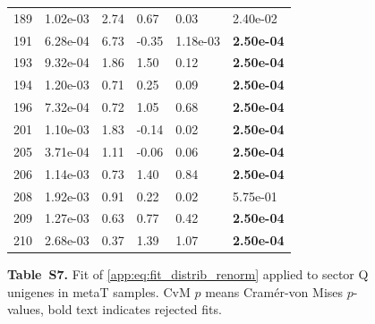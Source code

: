 \begin{figure}[htbp!]
{\begin{minipage}[t]{0.48\linewidth}
\begin{tabular}{llllll}
                    189 & 1.02e-03 & 2.74 & 0.67 & 0.03 & 2.40e-02\\
                    191 & 6.28e-04 & 6.73 & -0.35 & 1.18e-03 & \textbf{2.50e-04}\\
                    193 & 9.32e-04 & 1.86 & 1.50 & 0.12 & \textbf{2.50e-04}\\
                    194 & 1.20e-03 & 0.71 & 0.25 & 0.09 & \textbf{2.50e-04}\\
                    196 & 7.32e-04 & 0.72 & 1.05 & 0.68 & \textbf{2.50e-04}\\
                    201 & 1.10e-03 & 1.83 & -0.14 & 0.02 & \textbf{2.50e-04}\\
                    205 & 3.71e-04 & 1.11 & -0.06 & 0.06 & \textbf{2.50e-04}\\
                    206 & 1.14e-03 & 0.73 & 1.40 & 0.84 & \textbf{2.50e-04}\\
                    208 & 1.92e-03 & 0.91 & 0.22 & 0.02 & 5.75e-01\\
                    209 & 1.27e-03 & 0.63 & 0.77 & 0.42 & \textbf{2.50e-04}\\
                    210 & 2.68e-03 & 0.37 & 1.39 & 1.07 & \textbf{2.50e-04}\\
        \bottomrule
        \end{tabular}
    \end{minipage}
    }
    \caption*{\textbf{Table~S7.} Fit of \eqref{app:eq:fit_distrib_renorm} applied to sector Q unigenes in metaT samples. CvM $p$ means Cram\'er-von Mises $p$-values, bold text indicates rejected fits.}
    \label{subtab:app:sector:metaT:Q}
\end{figure}
